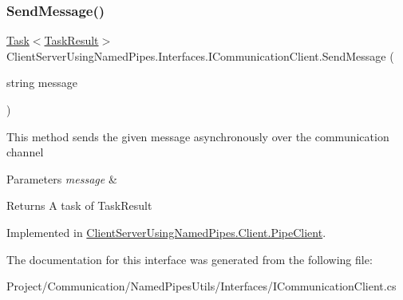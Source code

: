 \subsubsection{\texorpdfstring{Send\+Message()}{SendMessage()}}
{\footnotesize\ttfamily \hyperlink{class_system_1_1_threading_1_1_tasks_1_1_task}{Task}$<$\hyperlink{class_client_server_using_named_pipes_1_1_utilities_1_1_task_result}{Task\+Result}$>$ Client\+Server\+Using\+Named\+Pipes.\+Interfaces.\+I\+Communication\+Client.\+Send\+Message (\begin{DoxyParamCaption}\item[{string}]{message }\end{DoxyParamCaption})}



This method sends the given message asynchronously over the communication channel 


\begin{DoxyParams}{Parameters}
{\em message} & \\
\hline
\end{DoxyParams}
\begin{DoxyReturn}{Returns}
A task of Task\+Result
\end{DoxyReturn}


Implemented in \hyperlink{class_client_server_using_named_pipes_1_1_client_1_1_pipe_client_af1b876c52ee2cfc920dcf56ea7434839}{Client\+Server\+Using\+Named\+Pipes.\+Client.\+Pipe\+Client}.



The documentation for this interface was generated from the following file\+:\begin{DoxyCompactItemize}
\item 
Project/\+Communication/\+Named\+Pipes\+Utils/\+Interfaces/I\+Communication\+Client.\+cs\end{DoxyCompactItemize}
